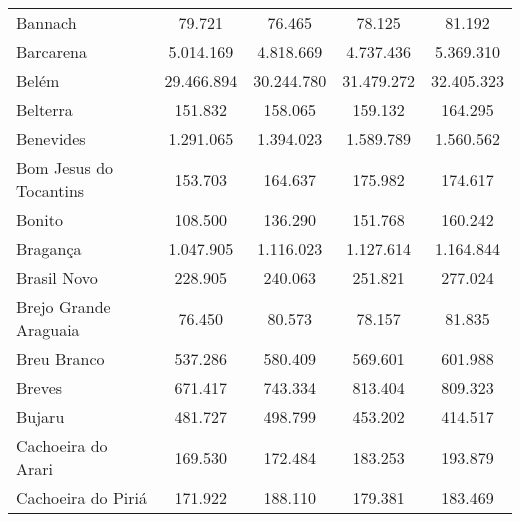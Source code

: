 \begin{table}[!htb]
{\begin{tabular}{l|c|c|c|c}
   Bannach                &  79.721     &  76.465     &  78.125     &  81.192       \\
   Barcarena              & 5.014.169   &  4.818.669  &  4.737.436  &  5.369.310    \\
   Belém                  & 29.466.894  &  30.244.780 &  31.479.272 &  32.405.323   \\
   Belterra               & 151.832     &  158.065    &  159.132    &  164.295      \\
   Benevides              & 1.291.065   & 1.394.023   &  1.589.789  &  1.560.562    \\
   Bom Jesus do Tocantins & 153.703     &  164.637    &  175.982    &  174.617      \\
   Bonito                 & 108.500     &  136.290    &  151.768    &  160.242      \\
   Bragança               & 1.047.905   &  1.116.023  &  1.127.614  &  1.164.844    \\
   Brasil Novo            &  228.905    &  240.063    &  251.821    &  277.024      \\
   Brejo Grande Araguaia  &  76.450     &  80.573     & 78.157      &  81.835       \\
   Breu Branco            & 537.286     &  580.409    & 569.601     &  601.988      \\
   Breves                 & 671.417     &  743.334    &  813.404    &  809.323      \\
   Bujaru                 & 481.727     &  498.799    &  453.202    &  414.517      \\
   Cachoeira do Arari     & 169.530     &  172.484    &  183.253    &  193.879      \\
   Cachoeira do Piriá     & 171.922     &  188.110    &  179.381    &  183.469      \\
\end{tabular}}
\end{table}



